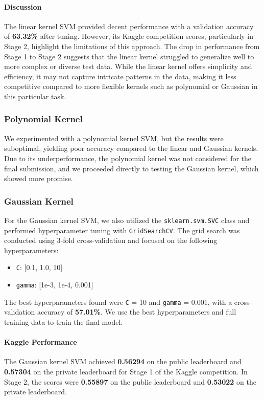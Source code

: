 \documentclass[10pt,a4paper]{article}
\begin{document}
\paragraph{Discussion}
The linear kernel SVM provided decent performance with a validation accuracy of \textbf{63.32\%} after tuning. However, its Kaggle competition scores, particularly in Stage 2, highlight the limitations of this approach. The drop in performance from Stage 1 to Stage 2 suggests that the linear kernel struggled to generalize well to more complex or diverse test data. While the linear kernel offers simplicity and efficiency, it may not capture intricate patterns in the data, making it less competitive compared to more flexible kernels such as polynomial or Gaussian in this particular task.


\subsubsection{Polynomial Kernel}
We experimented with a polynomial kernel SVM, but the results were suboptimal, yielding poor accuracy compared to the linear and Gaussian kernels. Due to its underperformance, the polynomial kernel was not considered for the final submission, and we proceeded directly to testing the Gaussian kernel, which showed more promise.


\subsubsection{Gaussian Kernel}
For the Gaussian kernel SVM, we also utilized the \texttt{sklearn.svm.SVC} class and performed hyperparameter tuning with \texttt{GridSearchCV}. The grid search was conducted using 3-fold cross-validation and focused on the following hyperparameters: \begin{itemize} \item \texttt{C}: [0.1, 1.0, 10] \item \texttt{gamma}: [1e-3, 1e-4, 0.001] \end{itemize}
The best hyperparameters found were \texttt{C} = 10 and \texttt{gamma} = 0.001, with a cross-validation accuracy of \textbf{57.01\%}. We use the best hyperparameters and full training data to train the final model.

\paragraph{Kaggle Performance}
The Gaussian kernel SVM achieved \textbf{0.56294} on the public leaderboard and \textbf{0.57304} on the private leaderboard for Stage 1 of the Kaggle competition. In Stage 2, the scores were \textbf{0.55897} on the public leaderboard and \textbf{0.53022} on the private leaderboard.
\end{document}
